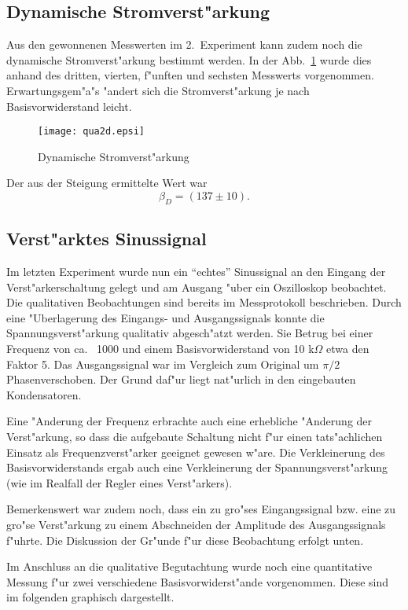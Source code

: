 \documentclass[a4paper,10pt]{article}
\begin{document}
\subsection{Dynamische Stromverst"arkung}
Aus den gewonnenen Messwerten im 2.~Experiment kann zudem noch die dynamische Stromverst"arkung bestimmt werden. In der Abb.~\ref{dyn} wurde dies anhand des dritten, vierten, f"unften und sechsten Messwerts vorgenommen. Erwartungsgem"a"s "andert sich die Stromverst"arkung je nach Basisvorwiderstand leicht.

\begin{figure}[htb]
	\centering
	\texttt{[image: qua2d.epsi]}
	\caption{Dynamische Stromverst"arkung}
	\label{dyn}
\end{figure}

Der aus der Steigung ermittelte Wert war
\begin{equation}
\beta_D = (137 \pm 10).
\end{equation}

\subsection{Verst"arktes Sinussignal}
Im letzten Experiment wurde nun ein "`echtes"' Sinussignal an den Eingang der Verst"arkerschaltung gelegt und am Ausgang "uber ein Oszilloskop beobachtet. Die qualitativen Beobachtungen sind bereits im Messprotokoll beschrieben. Durch eine "Uberlagerung des Eingangs- und Ausgangssignals konnte die Spannungsverst"arkung qualitativ abgesch"atzt werden. Sie Betrug bei einer Frequenz von ca.~ \unit{1000}{\hertz} und einem Basisvorwiderstand von 10 k$\Omega$ etwa den Faktor 5. Das Ausgangssignal war im Vergleich zum Original um $\pi/2$ Phasenverschoben. Der Grund daf"ur liegt nat"urlich in den eingebauten Kondensatoren.

Eine "Anderung der Frequenz erbrachte auch eine erhebliche "Anderung der Verst"arkung, so dass die aufgebaute Schaltung nicht f"ur einen tats"achlichen Einsatz als Frequenzverst"arker geeignet gewesen w"are. Die Verkleinerung des Basisvorwiderstands ergab auch eine Verkleinerung der Spannungsverst"arkung (wie im Realfall der Regler eines Verst"arkers).

Bemerkenswert war zudem noch, dass ein zu gro"ses Eingangssignal bzw. eine zu gro"se Verst"arkung zu einem Abschneiden der Amplitude des Ausgangssignals f"uhrte. Die Diskussion der Gr"unde f"ur diese Beobachtung erfolgt unten.

Im Anschluss an die qualitative Begutachtung wurde noch eine quantitative Messung f"ur zwei verschiedene Basisvorwiderst"ande vorgenommen. Diese sind im folgenden graphisch dargestellt.
\end{document}
